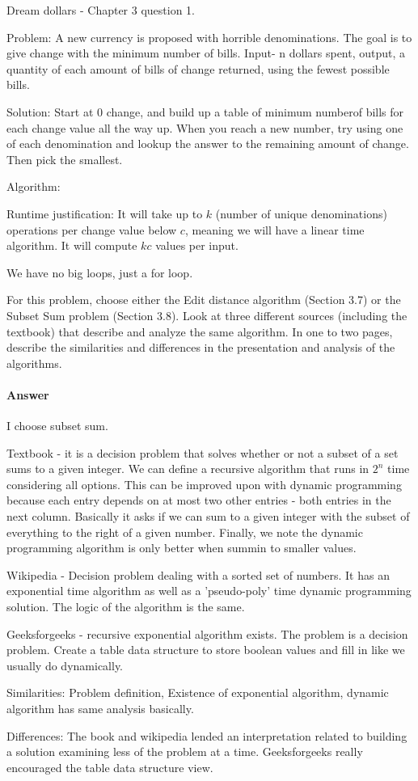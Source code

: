 \documentclass{article}
\begin{document}
Dream dollars - Chapter 3 question 1. 

Problem: A new currency is proposed with horrible denominations. The goal is to give change with the minimum number of bills. Input- n dollars spent, output, a quantity of each amount of bills of change returned, using the fewest possible bills. 

Solution: Start at 0 change, and build up a table of minimum numberof bills for each change value all the way up. When you reach a new number, try using one of each denomination and lookup the answer to the remaining amount of change. Then pick the smallest. 

Algorithm: 

Runtime justification: It will take up to $k$ (number of unique denominations) operations per change value below $c$, meaning we will have a linear time algorithm. It will compute $kc$ values per input.

We have no big loops, just a for loop. 

\nextprob
{}

For this problem, choose either the Edit distance algorithm (Section 3.7) or the
Subset Sum problem (Section 3.8). Look at three different sources (including the
textbook) that describe
and analyze the same algorithm. In one to two pages, describe the similarities
and differences in the presentation and analysis of the algorithms.

\paragraph{Answer}


I choose subset sum.

Textbook - it is a decision problem that solves whether or not a subset of a set sums to a given integer. We can define a recursive algorithm that runs in $2^n$ time considering all options. This can be improved upon with dynamic programming because each entry depends on at most two other entries - both entries in the next column. Basically it asks if we can sum to a given integer with the subset of everything to the right of a given number. Finally, we note the dynamic programming algorithm is only better when summin to smaller values. 

Wikipedia - Decision problem dealing with a sorted set of numbers. It has an exponential time algorithm as well as a 'pseudo-poly' time dynamic programming solution. The logic of the algorithm is the same. 

Geeksforgeeks - recursive exponential algorithm exists. The problem is a decision problem. Create a table data structure to store boolean values and fill in like we usually do dynamically. 


Similarities: Problem definition, Existence of exponential algorithm, dynamic algorithm has same analysis basically. 

Differences: The book and wikipedia lended an interpretation related to building a solution examining less of the problem at a time. Geeksforgeeks really encouraged the table data structure view. 
\end{document}

